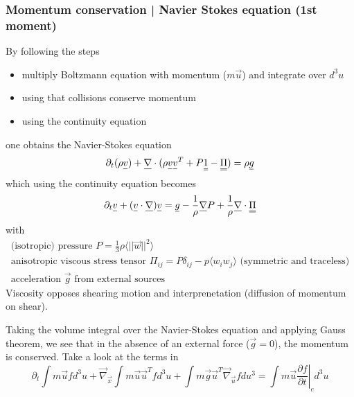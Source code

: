 \subsubsection{Momentum conservation | Navier Stokes equation (1st moment)}
By following the steps
\begin{itemize}
    \item multiply Boltzmann equation with momentum ($m\vec{u}$) and integrate over $d^3u$
    \item using that collisions conserve momentum
    \item using the continuity equation
\end{itemize}
\begin{mdframed}[style = padded]
one obtains the Navier-Stokes equation
\begin{equation}
    \partial_t (\rho \vec{v}) + \vec{\nabla} \cdot (\rho \vec{v}\vec{v}^T + P\mat{1} - \mat{\Pi}) = \rho \vec{g}
\end{equation}
which using the continuity equation becomes
\begin{equation}
    \partial_t \vec{v} + (\vec{v} \cdot \vec{\nabla}) \vec{v} = \vec{g} - \frac{1}{\rho} \vec{\nabla}P + \frac{1}{\rho} \vec{\nabla} \cdot \mat{\Pi}
\end{equation}
with
\begin{equation}
    \begin{gathered}
        \text{(isotropic) pressure } P = \frac{1}{3} \rho \langle ||\vec{w}||^2 \rangle \\
        \text{anisotropic viscous stress tensor } \Pi_{ij} = P\delta_{ij} - p \langle w_iw_j \rangle \text{ (symmetric and traceless)} \\
        \text{acceleration }\vec{g} \text{ from external sources }
    \end{gathered}
\end{equation}
Viscosity opposes shearing motion and interprenetation (diffusion of momentum on shear).
\end{mdframed}
Taking the volume integral over the Navier-Stokes equation and applying Gauss theorem, we see that in the absence
of an external force ($\vec{g} = 0$), the momentum is conserved.
Take a look at the terms in
\begin{equation}
     \partial_t \int m \vec{u} f d^3u + \vec{\nabla}_\vec{x} \int m \vec{u} \vec{u}^T f d^3u + \int m \vec{g} \vec{u}^T \vec{\nabla}_\vec{u} f du^3 = \int m \vec{u} \left. \frac{\partial f}{\partial t} \right|_c d^3u 
\end{equation}

